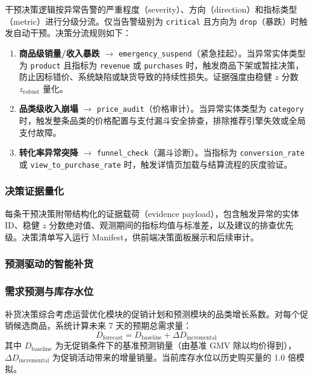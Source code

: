 干预决策逻辑按异常告警的严重程度（severity）、方向（direction）和指标类型（metric）进行分级分流。仅当告警级别为 \texttt{critical} 且方向为 \texttt{drop}（暴跌）时触发自动干预。决策分流规则如下：

\begin{enumerate}
    \item \textbf{商品级销量/收入暴跌} $\rightarrow$ \texttt{emergency\_suspend}（紧急挂起）。当异常实体类型为 \texttt{product} 且指标为 \texttt{revenue} 或 \texttt{purchases} 时，触发商品下架或暂挂决策，防止因标错价、系统缺陷或缺货导致的持续性损失。证据强度由稳健 $z$ 分数 $z_{\text{robust}}$ 量化。

    \item \textbf{品类级收入崩塌} $\rightarrow$ \texttt{price\_audit}（价格审计）。当异常实体类型为 \texttt{category} 时，触发整条品类的价格配置与支付漏斗安全排查，排除推荐引擎失效或全局支付故障。

    \item \textbf{转化率异常突降} $\rightarrow$ \texttt{funnel\_check}（漏斗诊断）。当指标为 \texttt{conversion\_rate} 或 \texttt{view\_to\_purchase\_rate} 时，触发详情页加载与结算流程的灰度验证。
\end{enumerate}

\subsubsection{决策证据量化}

每条干预决策附带结构化的证据载荷（evidence payload），包含触发异常的实体 ID、稳健 $z$ 分数绝对值、观测期间的指标均值与标准差，以及建议的排查优先级。决策清单写入运行 Manifest，供前端决策面板展示和后续审计。

\subsubsection{预测驱动的智能补货}

\subsubsection{需求预测与库存水位}

补货决策综合考虑运营优化模块的促销计划和预测模块的品类增长系数。对每个促销候选商品，系统计算未来 7 天的预期总需求量：
\begin{equation}
    D_{\text{forecast}} = D_{\text{baseline}} + \Delta D_{\text{incremental}}
    \label{eq:forecast-demand}
\end{equation}
其中 $D_{\text{baseline}}$ 为无促销条件下的基准预测销量（由基准 GMV 除以均价得到），$\Delta D_{\text{incremental}}$ 为促销活动带来的增量销量。当前库存水位以历史购买量的 1.0 倍模拟。

